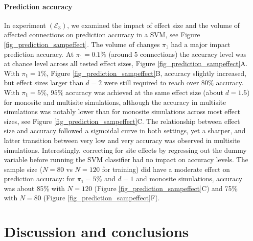 \documentclass[authoryear]{elsarticle}
\begin{document}
\paragraph{Prediction accuracy}
In experiment $(\mathcal{E}_3)$, we examined the impact of effect size and the volume of affected connections on prediction accuracy in a SVM, see Figure \ref{fig_prediction_sampeffect}. The volume of changes $\pi_1$ had a major impact prediction accuracy. At $\pi_1=0.1\%$ (around 5 connections) the accuracy level was at chance level across all tested effect sizes, Figure \ref{fig_prediction_sampeffect}A. With $\pi_1=1\%$, Figure \ref{fig_prediction_sampeffect}B, accuracy slightly increased, but effect sizes larger than $d=2$ were still required to reach over $80\%$ accuracy. With $\pi_1=5\%$, $95\%$ accuracy was achieved at the same effect size (about $d=1.5$) for monosite and multisite simulations, although the accuracy in multisite simulations was notably lower than for monosite simulations across most effect sizes, see Figure \ref{fig_prediction_sampeffect}C. The relationship between effect size and accuracy followed a sigmoidal curve in both settings, yet a sharper, and latter transition between very low and very accuracy was observed in multisite simulations. Interestingly, correcting for site effects by regressing out the dummy variable before running the SVM classifier had no impact on accuracy levels. The sample size ($N=80$ vs $N=120$ for training) did have a moderate effect on prediction accuracy: for $\pi_1=5\%$ and $d=1$ and monosite simulations, accuracy was about 85\% with $N=120$ (Figure \ref{fig_prediction_sampeffect}C) and 75\% with $N=80$ (Figure \ref{fig_prediction_sampeffect}F).


\section{Discussion and conclusions}

\end{document}
